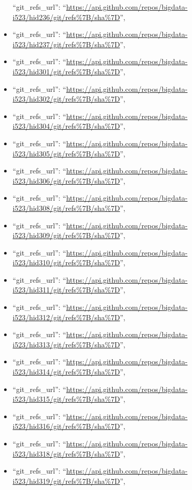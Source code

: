 \begin{itemize}
  ``git\_refs\_url'':
  ``\url{https://api.github.com/repos/bigdata-i523/hid236/git/refs\%7B/sha\%7D}'',
\item
  ``git\_refs\_url'':
  ``\url{https://api.github.com/repos/bigdata-i523/hid237/git/refs\%7B/sha\%7D}'',
\item
  ``git\_refs\_url'':
  ``\url{https://api.github.com/repos/bigdata-i523/hid301/git/refs\%7B/sha\%7D}'',
\item
  ``git\_refs\_url'':
  ``\url{https://api.github.com/repos/bigdata-i523/hid302/git/refs\%7B/sha\%7D}'',
\item
  ``git\_refs\_url'':
  ``\url{https://api.github.com/repos/bigdata-i523/hid304/git/refs\%7B/sha\%7D}'',
\item
  ``git\_refs\_url'':
  ``\url{https://api.github.com/repos/bigdata-i523/hid305/git/refs\%7B/sha\%7D}'',
\item
  ``git\_refs\_url'':
  ``\url{https://api.github.com/repos/bigdata-i523/hid306/git/refs\%7B/sha\%7D}'',
\item
  ``git\_refs\_url'':
  ``\url{https://api.github.com/repos/bigdata-i523/hid308/git/refs\%7B/sha\%7D}'',
\item
  ``git\_refs\_url'':
  ``\url{https://api.github.com/repos/bigdata-i523/hid309/git/refs\%7B/sha\%7D}'',
\item
  ``git\_refs\_url'':
  ``\url{https://api.github.com/repos/bigdata-i523/hid310/git/refs\%7B/sha\%7D}'',
\item
  ``git\_refs\_url'':
  ``\url{https://api.github.com/repos/bigdata-i523/hid311/git/refs\%7B/sha\%7D}'',
\item
  ``git\_refs\_url'':
  ``\url{https://api.github.com/repos/bigdata-i523/hid312/git/refs\%7B/sha\%7D}'',
\item
  ``git\_refs\_url'':
  ``\url{https://api.github.com/repos/bigdata-i523/hid313/git/refs\%7B/sha\%7D}'',
\item
  ``git\_refs\_url'':
  ``\url{https://api.github.com/repos/bigdata-i523/hid314/git/refs\%7B/sha\%7D}'',
\item
  ``git\_refs\_url'':
  ``\url{https://api.github.com/repos/bigdata-i523/hid315/git/refs\%7B/sha\%7D}'',
\item
  ``git\_refs\_url'':
  ``\url{https://api.github.com/repos/bigdata-i523/hid316/git/refs\%7B/sha\%7D}'',
\item
  ``git\_refs\_url'':
  ``\url{https://api.github.com/repos/bigdata-i523/hid318/git/refs\%7B/sha\%7D}'',
\item
  ``git\_refs\_url'':
  ``\url{https://api.github.com/repos/bigdata-i523/hid319/git/refs\%7B/sha\%7D}'',

\end{itemize}
